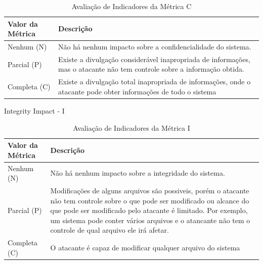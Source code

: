 \begin{itemize}
	\begin{table}[H]
	\begin{center}
	    \begin{tabular}{ | l | p{10cm} |}
	    \hline
	    Valor da Métrica & Descrição \\ \hline
	    Nenhum (N) & Não há nenhum impacto sobre a confidencialidade do sistema. \\ \hline
	    Parcial (P) & Existe a divulgação considerável inapropriada de informações, mas o atacante não tem controle sobre a informação obtida.  \\ \hline
	    Completa (C) & Existe a divulgação total inapropriada de informações, onde o atacante pode obter informações de todo o sistema\\ \hline
	    \end{tabular}
	    \caption{Avaliação de Indicadores da Métrica C}
	    \label{tab:c_scoring}
	\end{center}
	\end{table}

	Integrity Impact - I
	\begin{table}[H]
	\begin{center}
	    \begin{tabular}{ | l | p{10cm} |}
	    \hline
	    Valor da Métrica & Descrição \\ \hline
	    Nenhum (N) & Não há nenhum impacto sobre a integridade do sistema. \\ \hline
	    Parcial (P) & Modificações de alguns arquivos são possiveis, porém o atacante não tem controle sobre o que pode ser modificado ou alcance do que pode ser modificado pelo atacante é limitado. Por exemplo, um sistema pode conter vários arquivos e o atancante não tem o controle de qual arquivo ele irá afetar.  \\ \hline
	    Completa (C) & O atacante é capaz de modificar qualquer arquivo do sistema\\ \hline
	    \end{tabular}
	    \caption{Avaliação de Indicadores da Métrica I}
	    \label{tab:i_scoring}
	\end{center}
	\end{table}



\end{itemize}
